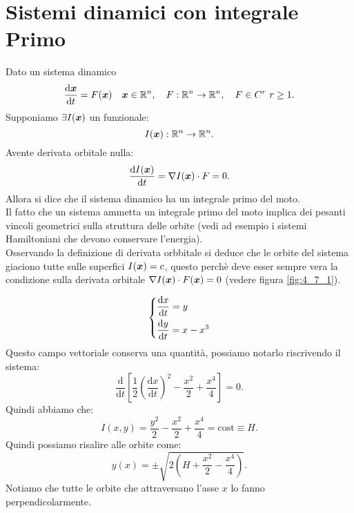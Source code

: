 \section{Sistemi dinamici con integrale Primo}%
\label{sub:Sistemi dinamici con integrale Primo}
Dato un sistema dinamico 
\[
    \frac{\text{d} \boldsymbol{x}}{\text{d} t} = F(\boldsymbol{x}) \quad  \boldsymbol{x}\in \mathbb{R}^n, \quad F:\mathbb{R}^n\to \mathbb{R}^n, \quad  F \in C^r \ r \ge 1
.\] 
Supponiamo $\exists I (\boldsymbol{x}) $  un funzionale:
\[
    I(\boldsymbol{x}): \mathbb{R}^n\to \mathbb{R}^n
.\] 
Avente derivata orbitale nulla:
\[
    \frac{\text{d} I(\boldsymbol{x}) }{\text{d} t} =  \nabla I(\boldsymbol{x}) \cdot F = 0
.\] 
Allora si dice che il sistema dinamico ha un integrale primo del moto.\\
Il fatto che un sistema ammetta un integrale primo del moto implica dei pesanti vincoli geometrici sulla struttura delle orbite (vedi ad esempio i sistemi Hamiltoniani che devono conservare l'energia).\\
Osservando la definizione di derivata orbbitale si deduce che le orbite del sistema giaciono tutte sulle superfici $I(\boldsymbol{x}) = c$, questo perchè deve esser sempre vera la condizione sulla derivata orbitale $\nabla I(\boldsymbol{x}) \cdot F(\boldsymbol{x}) = 0$ (vedere figura \ref{fig:4_7_1}).
\begin{exmp}[]
    \[
    \begin{dcases}
    \frac{\text{d} x}{\text{d} t} = y\\
    \frac{\text{d} y}{\text{d} t} = x-x^3
    \end{dcases}
    \]
    Questo campo vettoriale conserva una quantità, possiamo notarlo riscrivendo il sistema:
    \[
        \frac{\text{d} }{\text{d} t} \left[\frac{1}{2}\left(\frac{\text{d} x}{\text{d} t} \right)^2- \frac{x^2}{2}+\frac{x^4}{4}\right]= 0
    .\] 
    Quindi abbiamo che:
    \[
	I(x, y) = \frac{y^2}{2}-\frac{x^2}{2}+\frac{x^4}{4}= \text{cost}\equiv H
    .\] 
    Quindi possiamo risalire alle orbite come:
    \[
	y(x) = \pm \sqrt{2(H + \frac{x^2}{2}-\frac{x^4}{4}) } 
    .\] 
    Notiamo che tutte le orbite che attraversano l'asse $x$ lo fanno perpendicolarmente.
\end{exmp}
\noindent
